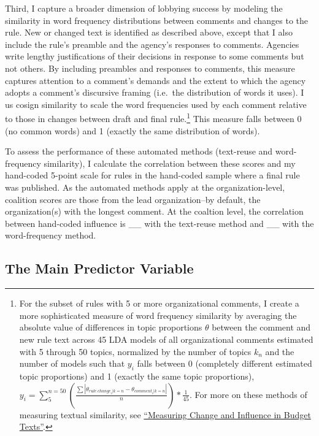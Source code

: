 \documentclass[
      12pt,
        ]{article}
\begin{document}
Third, I capture a broader dimension of lobbying success by modeling the similarity in word frequency distributions between comments and changes to the rule. New or changed text is identified as described above, except that I also include the rule's preamble and the agency's responses to comments. Agencies write lengthy justifications of their decisions in response to some comments but not others. By including preambles and responses to comments, this measure captures attention to a comment's demands and the extent to which the agency adopts a comment's discursive framing (i.e.~the distribution of words it uses). I us cosign similarity to scale the word frequencies used by each comment relative to those in changes between draft and final rule.\footnote{For the subset of rules with 5 or more organizational comments, I create a more sophisticated measure of word frequency similarity by averaging the absolute value of differences in topic proportions \(\theta\) between the comment and new rule text across 45 LDA models of all organizational comments estimated with 5 through 50 topics, normalized by the number of topics \(k_n\) and the number of models such that \(y_i\) falls between 0 (completely different estimated topic proportions) and 1 (exactly the same topic proportions), \(y_i = \sum_{5}^{n=50}(\frac{\sum|\theta_{rule\ change_i|k=n}-\theta_{comment_i|k=n}|}{n})*\frac{1}{45}\). For more on these methods of measuring textual similarity, see \href{https://judgelord.github.io/budgets/JudgeLordAPSA2017.pdf}{``Measuring Change and Influence in Budget Texts''}.} This measure falls between 0 (no common words) and 1 (exactly the same distribution of words).

To assess the performance of these automated methods (text-reuse and word-frequency similarity), I calculate the correlation between these scores and my hand-coded 5-point scale for rules in the hand-coded sample where a final rule was published. As the automated methods apply at the organization-level, coalition scores are those from the lead organization--by default, the organization(s) with the longest comment. At the coaltion level, the correlation between hand-coded influence is \_\_ with the text-reuse method and \_\_ with the word-frequency method.

\hypertarget{the-main-predictor-variable}{%
\subsection{The Main Predictor Variable}\label{the-main-predictor-variable}}
\end{document}

